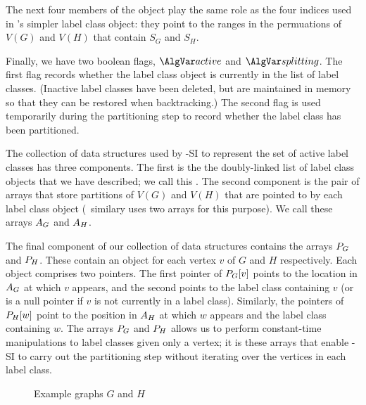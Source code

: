 The next four members of the object play the same role as the four indices used in \McSplit's
simpler label class object: they point to the ranges in the permuations of $V(G)$ and $V(H)$ that
contain $S_G$ and $S_H$.

Finally, we have two boolean flags, $\varActive$ and $\varSplitting$.  The first flag
records whether the label class object is currently in the list of label classes.  (Inactive
label classes have been deleted, but are maintained in memory so that they can be restored
when backtracking.)  The second flag is used temporarily during the partitioning step
to record whether the label class has been partitioned.

The collection of data structures used by \McSplit-SI to represent the set of
active label classes has three components.  The first is the the doubly-linked
list of label class objects that we have described; we call this \calLC.  The
second component is the pair of arrays that store partitions of $V(G)$ and
$V(H)$ that are pointed to by each label class object (\McSplit\ similary uses
two arrays for this purpose).   We call these arrays $A_G$ and $A_H$.

The final component of our collection of data structures contains the arrays $P_G$
and $P_H$.  These contain
an object for each vertex $v$ of $G$ and $H$ respectively.  Each object comprises two pointers.
The first pointer of $P_G[v]$ points to the location in $A_G$ at which $v$
appears, and the second points to the label class containing $v$ (or is a null pointer
if $v$ is not currently in a label class).
Similarly, the pointers of $P_H[w]$ point to the position in $A_H$ at which $w$
appears and the label class containing $w$.
The arrays $P_G$ and $P_H$ allows us to perform constant-time
manipulations to label classes given only a vertex; it is these arrays that enable
\McSplit-SI to carry out the partitioning step without iterating over the vertices in each label class.

\begin{figure}[htb]
    \centering
    \caption{Example graphs $G$ and $H$}
    \label{figure:example-g-and-h-redux}
\end{figure}

